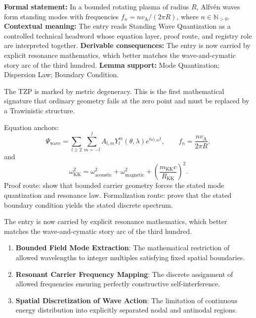 \begingroup\footnotesize\setlength{\emergencystretch}{3em}\sloppy
\textbf{Formal statement:} In a bounded rotating plasma of radius \(R\), Alfv\'en waves form standing modes with frequencies \(f_n=n v_{\mathrm{A}}/(2\pi R)\), where \(n\in\mathbb{N}_{>0}\). \textbf{Contextual meaning:} The entry reads Standing Wave Quantization as a controlled technical headword whose equation layer, proof route, and registry role are interpreted together. \textbf{Derivable consequences:} The entry is now carried by explicit resonance mathematics, which better matches the wave-and-cymatic story arc of the third hundred. \textbf{Lemma support:} Mode Quantization; Dispersion Law; Boundary Condition.\par
\endgroup

The TZP is marked by metric degeneracy. This is the first mathematical signature that ordinary geometry fails at the zero point and must be replaced by a Trawinistic structure.

Equation anchors:
\[
\Psi_{\mathrm{wave}}=\sum_{l\ge2}\sum_{m=-l}^{l}A_{l,m}Y_l^m(\theta,\lambda)e^{i\omega_{l,m}t},\qquad
f_n=\frac{n v_{\mathrm{A}}}{2\pi R},
\]
and
\[
\omega_{\mathrm{KK}}^{2}=\omega_{\mathrm{acoustic}}^{2}+\omega_{\mathrm{magnetic}}^{2}
+\left(\frac{m_{\mathrm{KK}}c}{R_{\mathrm{KK}}}\right)^2.
\]
Proof route: show that bounded carrier geometry forces the stated mode quantization and resonance law. Formalization route: prove that the stated boundary condition yields the stated discrete spectrum.

The entry is now carried by explicit resonance mathematics, which better matches the wave-and-cymatic story arc of the third hundred.
\endgroup

\begin{enumerate}[leftmargin=1.6em,itemsep=6pt,topsep=4pt]
\item \textbf{Bounded Field Mode Extraction}: The mathematical restriction of allowed wavelengths to integer multiples satisfying fixed spatial boundaries.
\item \textbf{Resonant Carrier Frequency Mapping}: The discrete assignment of allowed frequencies ensuring perfectly constructive self-interference.
\item \textbf{Spatial Discretization of Wave Action}: The limitation of continuous energy distribution into explicitly separated nodal and antinodal regions.
\end{enumerate}

